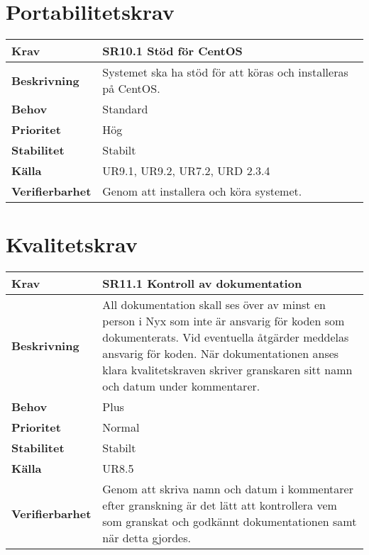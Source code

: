 \documentclass[a4paper, twoside, 11pt, titlepage]{article}
\begin{document}
\clearpage
\section{Portabilitetskrav}


\begin{tabular} { p{2.6cm} p{12.5cm} }
	\hline
	\sffamily\textbf{Krav} & \sffamily\textbf{SR10.1 Stöd för CentOS } \\
	\hline
	\sffamily\textbf{Beskrivning} & Systemet ska ha stöd för att köras och installeras på CentOS.  \\
	\hline
	\sffamily\textbf{Behov} & Standard  \\
	\hline
	\sffamily\textbf{Prioritet} & Hög  \\
	\hline
	\sffamily\textbf{Stabilitet} & Stabilt  \\
	\hline
	\sffamily\textbf{Källa} & UR9.1, UR9.2, UR7.2, URD 2.3.4  \\
	\hline
	\sffamily\textbf{Verifierbarhet} & Genom att installera och köra systemet.  \\
	\hline
\end{tabular}


\clearpage
\section{Kvalitetskrav}


\begin{tabular} { p{2.6cm} p{12.5cm} }
	\hline
	\sffamily\textbf{Krav} & \sffamily\textbf{SR11.1 Kontroll av dokumentation } \\
	\hline
	\sffamily\textbf{Beskrivning} &  All dokumentation skall ses över av minst en person i Nyx som inte är ansvarig för koden som dokumenterats. Vid eventuella åtgärder meddelas ansvarig för koden. När dokumentationen anses klara kvalitetskraven skriver granskaren sitt namn och datum under kommentarer.  \\
	\hline
	\sffamily\textbf{Behov} & Plus  \\
	\hline
	\sffamily\textbf{Prioritet} & Normal  \\
	\hline
	\sffamily\textbf{Stabilitet} & Stabilt  \\
	\hline
	\sffamily\textbf{Källa} &  UR8.5  \\
	\hline
	\sffamily\textbf{Verifierbarhet} &  Genom att skriva namn och datum i kommentarer efter granskning är det lätt att kontrollera vem som granskat och godkännt dokumentationen samt när detta gjordes.  \\
	\hline
\end{tabular}
\vspace{6mm}
\end{document}
